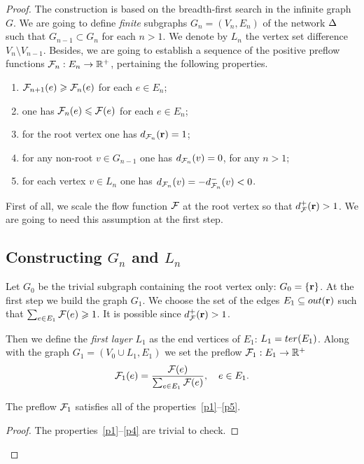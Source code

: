 \documentclass[12pt,oneside,a4paper]{amsart}
\begin{document}
\begin{proof}
        The construction is based on the breadth-first search in the infinite graph $G$.
        We are going to define \emph{finite} subgraphs $G_n = (V_n, E_n)$ of the network $\Delta$ such that $G_{n-1} \subset G_{n}$ for each $n > 1$.
        We denote by $L_n$ the vertex set difference $V_n \setminus V_{n-1}$.
        Besides, we are going to establish a sequence of the positive preflow functions $\mathcal{F}_{n}: E_n \to \mathbb{R}^{+}$,
          pertaining the following properties.
        \begin{enumerate}[label=\textbf{P\arabic*}]
          \item \label{p1} $\mathcal{F}_{n+1}(e) \geqslant \mathcal{F}_{n}(e)$ for each $e \in E_n$;
          \item \label{p2} one has $\mathcal{F}_{n}(e) \leqslant \mathcal{F}(e)$ for each $e \in E_n$;
          \item \label{p3} for the root vertex one has $d_{\mathcal{F}_{n}}(\mathbf{r}) = 1$;
          \item \label{p4} for any non-root $v \in G_{n-1}$ one has $d_{\mathcal{F}_{n}}(v) = 0$, for any $n > 1$;
          \item \label{p5} for each vertex $v \in L_n$ one has $d_{\mathcal{F}_{n}}(v) = -d^{-}_{\mathcal{F}_{n}}(v) < 0$.
        \end{enumerate}
        First of all, we scale the flow function $\mathcal{F}$ at the root vertex so that $d^{+}_{\mathcal{F}}(\mathbf{r}) > 1$.
        We are going to need this assumption at the first step.
      \medskip
      \subsection{Constructing $G_n$ and $L_n$}
        Let $G_0$ be the trivial subgraph containing the root vertex only: $G_0 = \left\{\mathbf{r}\right\}$.
        At the first step we build the graph $G_1$.
        We choose the set of the edges $E_1 \subseteq out(\mathbf{r})$ such that $\sum_{e \in E_1} \mathcal{F}(e) \geqslant 1$.
        It is possible since $d^{+}_{\mathcal{F}}(\mathbf{r}) > 1$.

        Then we define the \emph{first layer} $L_1$ as the end vertices of $E_1$: $L_1 = ter(E_1)$.
        Along with the graph $G_1 = (V_0 \cup L_1, E_1)$ we set the preflow $\mathcal{F}_{1}: E_1 \to \mathbb{R}^{+}$
        \[
          \mathcal{F}_{1}(e) = \frac{\mathcal{F}(e)}{\sum_{e\in E_1}{\mathcal{F}(e)}}, \quad e \in E_1.
        \]
        \begin{prop}
          The preflow $\mathcal{F}_{1}$ satisfies all of the properties~\ref{p1}--\ref{p5}.
        \end{prop}
        \begin{proof}
          The properties~\ref{p1}--\ref{p4} are trivial to check.


\end{proof}
\end{proof}
\end{document}
